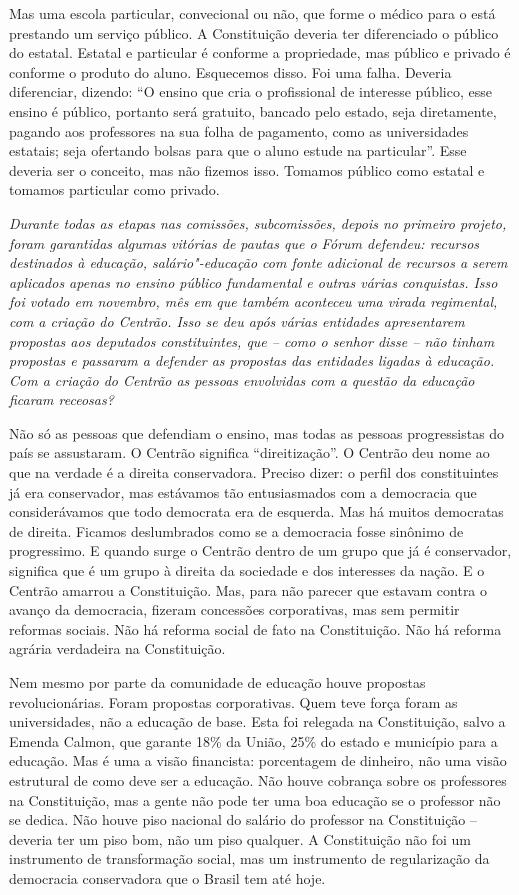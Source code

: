 Mas uma escola particular, convecional ou não, que forme o médico para o
 está prestando um serviço público. A Constituição deveria ter
diferenciado o público do estatal. Estatal e particular é conforme a
propriedade, mas público e privado é conforme o produto do aluno.
Esquecemos disso. Foi uma falha. Deveria diferenciar, dizendo: ``O
ensino que cria o profissional de interesse público, esse ensino é
público, portanto será gratuito, bancado pelo estado, seja diretamente,
pagando aos professores na sua folha de pagamento, como as universidades
estatais; seja ofertando bolsas para que o aluno estude na particular''.
Esse deveria ser o conceito, mas não fizemos isso. Tomamos público como
estatal e tomamos particular como privado.

\medskip

\noindent\emph{Durante todas as etapas nas comissões, subcomissões, depois no
primeiro projeto, foram garantidas algumas vitórias de pautas que o
Fórum defendeu: recursos destinados à educação, salário"-educação com
fonte adicional de recursos a serem aplicados apenas no ensino público
fundamental e outras várias conquistas. Isso foi votado em novembro, mês
em que também aconteceu uma virada regimental, com a criação do Centrão.
Isso se deu após várias entidades apresentarem propostas aos deputados
constituintes, que -- como o senhor disse -- não tinham propostas e
passaram a defender as propostas das entidades ligadas à educação. Com a
criação do Centrão as pessoas envolvidas com a questão da educação
ficaram receosas?}

Não só as pessoas que defendiam o ensino, mas todas as
pessoas progressistas do país se assustaram. O Centrão significa
``direitização''. O Centrão deu nome ao que na verdade é a direita
conservadora. Preciso dizer: o perfil dos constituintes já era
conservador, mas estávamos tão entusiasmados com a democracia que
considerávamos que todo democrata era de esquerda. Mas há muitos
democratas de direita. Ficamos deslumbrados como se a democracia fosse
sinônimo de progressimo. E quando surge o Centrão dentro de um grupo que
já é conservador, significa que é um grupo à direita da sociedade e dos
interesses da nação. E o Centrão amarrou a Constituição. Mas, para não
parecer que estavam contra o avanço da democracia, fizeram concessões
corporativas, mas sem permitir reformas sociais. Não há reforma social
de fato na Constituição. Não há reforma agrária verdadeira na
Constituição.

Nem mesmo por parte da comunidade de educação houve propostas
revolucionárias. Foram propostas corporativas. Quem teve força foram as
universidades, não a educação de base. Esta foi relegada na
Constituição, salvo a Emenda Calmon, que garante 18\% da União, 25\% do
estado e município para a educação. Mas é uma a visão financista:
porcentagem de dinheiro, não uma visão estrutural de como deve ser a
educação. Não houve cobrança sobre os professores na Constituição, mas a
gente não pode ter uma boa educação se o professor não se dedica. Não
houve piso nacional do salário do professor na Constituição -- deveria
ter um piso bom, não um piso qualquer. A Constituição não foi um
instrumento de transformação social, mas um instrumento de regularização
da democracia conservadora que o Brasil tem até hoje.

